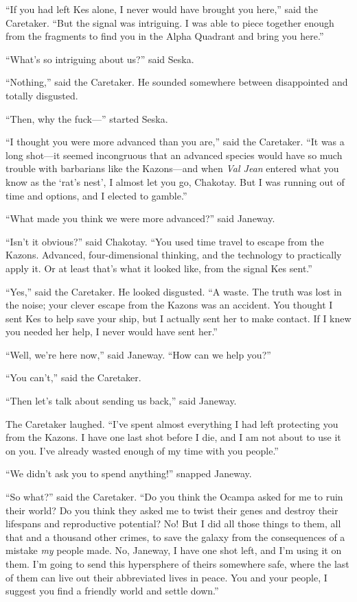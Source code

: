 \documentclass[twoside,letterpaper,12pt]{memoir}
\begin{document}
``If you had left Kes alone, I never would have brought you here,'' said the Caretaker. ``But the signal was intriguing. I was able to piece together enough from the fragments to find you in the Alpha Quadrant and bring you here.'' 

``What’s so intriguing about us?'' said Seska. 

``Nothing,'' said the Caretaker. He sounded somewhere between disappointed and totally disgusted. 

``Then, why the fuck---'' started Seska. 

``I thought you were more advanced than you are,'' said the Caretaker. ``It was a long shot---it seemed incongruous that an advanced species would have so much trouble with barbarians like the Kazons---and when \textit{Val Jean} entered what you know as the `rat's nest', I almost let you go, Chakotay. But I was running out of time and options, and I elected to gamble.'' 

``What made you think we were more advanced?'' said Janeway. 

``Isn’t it obvious?'' said Chakotay. ``You used time travel to escape from the Kazons. Advanced, four-dimensional thinking, and the technology to practically apply it. Or at least that’s what it looked like, from the signal Kes sent.'' 

``Yes,'' said the Caretaker. He looked disgusted. ``A waste. The truth was lost in the noise; your clever escape from the Kazons was an accident. You thought I sent Kes to help save your ship, but I actually sent her to make contact. If I knew you needed her help, I never would have sent her.'' 

``Well, we're here now,'' said Janeway. ``How can we help you?'' 

``You can't,'' said the Caretaker. 

``Then let's talk about sending us back,'' said Janeway. 

The Caretaker laughed. ``I’ve spent almost everything I had left protecting you from the Kazons. I have one last shot before I die, and I am not about to use it on you. I've already wasted enough of my time with you people.'' 

``We didn't ask you to spend anything!'' snapped Janeway. 

``So what?'' said the Caretaker. ``Do you think the Ocampa asked for me to ruin their world? Do you think they asked me to twist their genes and destroy their lifespans and reproductive potential? No! But I did all those things to them, all that and a thousand other crimes, to save the galaxy from the consequences of a mistake \textit{my} people made. No, Janeway, I have one shot left, and I'm using it on them. I'm going to send this hypersphere of theirs somewhere safe, where the last of them can live out their abbreviated lives in peace. You and your people, I suggest you find a friendly world and settle down.'' 
\end{document}
